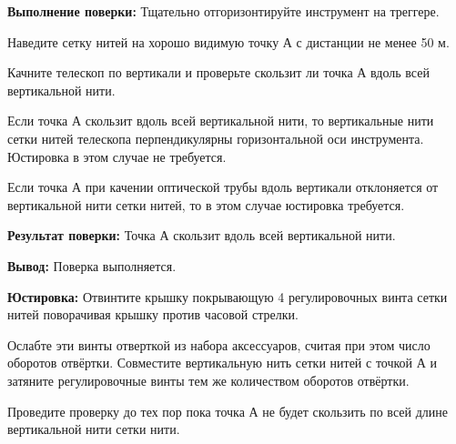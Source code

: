 \documentclass[a4paper]{article}
\begin{document}
{\par \textbf{Выполнение поверки:} Тщательно отгоризонтируйте инструмент на треггере.
\par Наведите сетку нитей на хорошо видимую точку А с дистанции не менее 50 м.
\par Качните телескоп по вертикали и проверьте скользит ли точка А вдоль всей
вертикальной нити.
\par Если точка А скользит вдоль всей вертикальной нити, то вертикальные нити сетки
нитей телескопа перпендикулярны горизонтальной оси инструмента. Юстировка в этом случае не требуется.
\par Если точка А при качении оптической трубы вдоль вертикали отклоняется от
вертикальной нити сетки нитей, то в этом случае юстировка требуется.
\par \textbf{Результат поверки:} Точка А скользит вдоль всей вертикальной нити.
\par\textbf{Вывод:} Поверка выполняется.
\par \textbf{Юстировка:} Отвинтите крышку покрывающую 4 регулировочных винта сетки нитей поворачивая
крышку против часовой стрелки.
\par Ослабте эти винты отверткой из набора аксессуаров, считая при этом число оборотов
отвёртки. Совместите вертикальную нить сетки нитей с точкой А и затяните
регулировочные винты тем же количеством оборотов отвёртки.
\par Проведите проверку  до тех пор пока точка А не будет скользить по всей длине вертикальной нити сетки нити.

}
\end{document}
